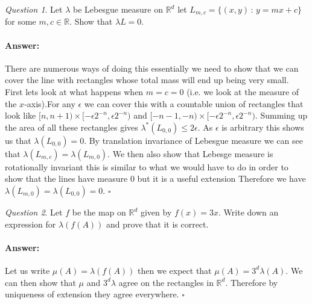 \documentclass[11pt]{article}
\theoremstyle{definition}
\theoremstyle{remark}
\newtheorem{q}{Question}
\newenvironment{ans}{\paragraph{Answer:}}{\hfill$\square$}
\begin{document}
\begin{q}
Let $\lambda$ be Lebesgue measure on $\mathbb{R}^d$ let $L_{m,c} = \{ (x,y)\,:\, y=mx+c \}$ for some $m, c \in \mathbb{R}$. Show that $\lambda{L}=0$.
\end{q}
\begin{ans}
There are numerous ways of doing this essentially we need to show that we can cover the line with rectangles whose total mass will end up being very small. First lets look at what happens when $m = c= 0$ (i.e. we look at the measure of the $x$-axis).For any $\epsilon$ we can cover this with a countable union of rectangles that look like $[n,n+1) \times [-\epsilon 2^{-n}, \epsilon 2^{-n})$ and $[-n-1, -n) \times  [-\epsilon 2^{-n}, \epsilon 2^{-n})$. Summing up the area of all these rectangles gives $\lambda^*(L_{0,0}) \leq 2\epsilon$. As $\epsilon$ is arbitrary this shows us that $\lambda(L_{0,0})=0$. By translation invariance of Lebesgue measure we can see that $\lambda(L_{m,c}) = \lambda(L_{m,0})$. We then also show that Lebesge measure is rotationally invariant this is similar to what we would have to do in order to show that the lines have measure 0 but it is a useful extension Therefore we have $\lambda(L_{m,0}) = \lambda(L_{0,0}) = 0$.
\end{ans}

\begin{q}
Let $f$ be the map on $\mathbb{R}^d$ given by $f(x) = 3x$. Write down an expression for $\lambda(f(A))$ and prove that it is correct. 
\end{q}
\begin{ans}
Let us write $\mu(A) = \lambda(f(A))$ then we expect that $\mu(A) = 3^d \lambda(A)$. We can then show that $\mu$ and $3^d\lambda$ agree on the rectangles in $\mathbb{R}^d$. Therefore by uniqueness of extension they agree everywhere.
\end{ans}
\end{document}
